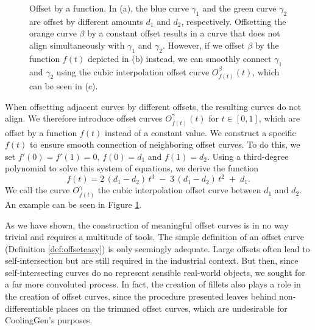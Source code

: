 \documentclass[a4paper, 11pt]{report}
\theoremstyle{definition}
\begin{document}
	\begin{figure}[H]
		\centering
		\begin{subfigure}{0.3\textwidth}
			
			\caption{}
		\end{subfigure}
		\begin{subfigure}{0.3\textwidth}
			
			\caption{}
		\end{subfigure}
		\begin{subfigure}{0.3\textwidth}
			
			\caption{}
		\end{subfigure}
		\caption{Offset by a function. In (a), the blue curve $\gamma_1$ and the green curve $\gamma_2$ are offset by different amounts $d_1$ and $d_2$, respectively. Offsetting the orange curve $\beta$ by a constant offset results in a curve that does not align simultaneously with $\gamma_1$ and $\gamma_2$. However, if we offset $\beta$ by the function $f(t)$ depicted in (b) instead, we can smoothly connect $\gamma_1$ and $\gamma_2$ using the cubic interpolation offset curve $O^{\beta}_{f(t)}(t)$, which can be seen in (c).}
		\label{fig:cubicinterpolationoffset}
	\end{figure}

	When offsetting adjacent curves by different offsets, the resulting curves do not align. We therefore introduce offset curves $O^{\gamma}_{f(t)} (t)$ for $t\in[0,1]$, which are offset by a function $f(t)$ instead of a constant value. We construct a specific $f(t)$ to ensure smooth connection of neighboring offset curves. To do this, we set $f'(0) = f'(1) = 0$, $f(0) = d_1$ and $f(1) = d_2$. Using a third-degree polynomial to solve this system of equations, we derive the function
	$$ f(t) = 2\,(d_1 - d_2)\,t^3 \;-\; 3\,(d_1 - d_2)\,t^2 \;+\; d_1.$$
	We call the curve $O^{\gamma}_{f(t)}$ the cubic interpolation offset curve between $d_1$ and $d_2$. An example can be seen in Figure \ref{fig:cubicinterpolationoffset}.

	As we have shown, the construction of meaningful offset curves is in no way trivial and requires a multitude of tools. The simple definition of an offset curve (Definition \ref{def:offseteasy}) is only seemingly adequate. Large offsets often lead to self-intersection but are still required in the industrial context. But then, since self-intersecting curves do no represent sensible real-world objects, we sought for a far more convoluted process. In fact, the creation of fillets also plays a role in the creation of offset curves, since the procedure presented leaves behind non-differentiable places on the trimmed offset curves, which are undesirable for CoolingGen's purposes.
\end{document}
